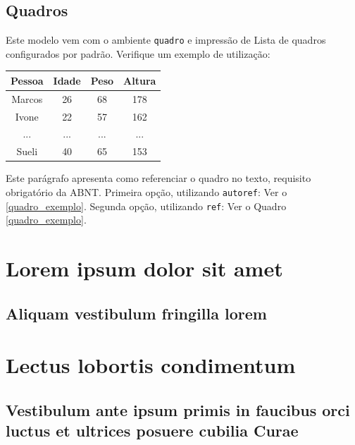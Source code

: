\documentclass[
	12pt,				%
	openright,			%
	oneside,			%
	a4paper,			%
	english,			%
	brazil				%
	]{abntex2}
\providecommand{\lipsum}[1][]{}
\begin{document}
\section{Quadros}

Este modelo vem com o ambiente \texttt{quadro} e impressão de Lista de quadros 
configurados por padrão. Verifique um exemplo de utilização:

\begin{quadro}[htb]
\caption{\label{quadro_exemplo}Exemplo de quadro}
\begin{tabular}{|c|c|c|c|}
	\hline
	\textbf{Pessoa} & \textbf{Idade} & \textbf{Peso} & \textbf{Altura} \\ \hline
	Marcos & 26    & 68   & 178    \\ \hline
	Ivone  & 22    & 57   & 162    \\ \hline
	...    & ...   & ...  & ...    \\ \hline
	Sueli  & 40    & 65   & 153    \\ \hline
\end{tabular}
\end{quadro}

Este parágrafo apresenta como referenciar o quadro no texto, requisito
obrigatório da ABNT. 
Primeira opção, utilizando \texttt{autoref}: Ver o \autoref{quadro_exemplo}. 
Segunda opção, utilizando  \texttt{ref}: Ver o Quadro \ref{quadro_exemplo}.


\chapter{Lorem ipsum dolor sit amet}

\section{Aliquam vestibulum fringilla lorem}

\lipsum[1]

\lipsum[2-3]

\chapter{Lectus lobortis condimentum}

\section{Vestibulum ante ipsum primis in faucibus orci luctus et ultrices
posuere cubilia Curae}
\end{document}
